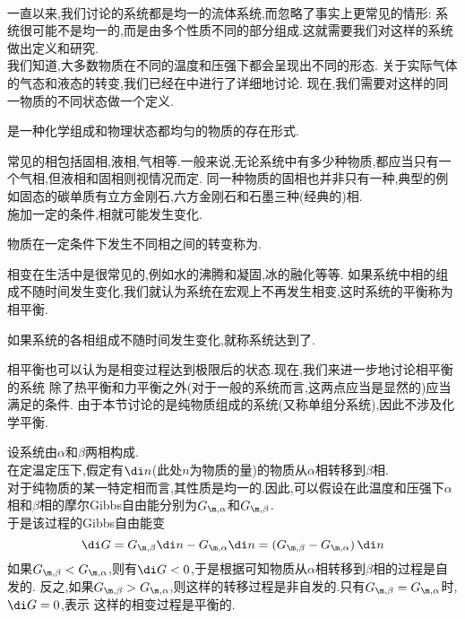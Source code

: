 \documentclass{ctexart}
\begin{document}
\pagestyle{plain}
\noindent{}\vspace{15pt}\\
\indent 一直以来,我们讨论的系统都是均一的流体系统,而忽略了事实上更常见的情形:%
系统很可能不是均一的,而是由多个性质不同的部分组成.这就需要我们对这样的系统做出定义和研究.\vspace{12pt}\\
\indent 我们知道,大多数物质在不同的温度和压强下都会呈现出不同的形态.%
关于实际气体的气态和液态的转变,我们已经在中进行了详细地讨论.%
现在,我们需要对这样的同一物质的不同状态做一个定义.
\begin{definition}[4A.1.1 相]
    是一种化学组成和物理状态都均匀的物质的存在形式.
\end{definition}
常见的相包括固相,液相,气相等.一般来说,无论系统中有多少种物质,都应当只有一个气相,但液相和固相则视情况而定.%
同一种物质的固相也并非只有一种,典型的例如固态的碳单质有立方金刚石,六方金刚石和石墨三种(经典的)相.\vspace{4pt}\\
\indent 施加一定的条件,相就可能发生变化.
\begin{definition}[4A.1.2 相变]
    物质在一定条件下发生不同相之间的转变称为.
\end{definition}
相变在生活中是很常见的,例如水的沸腾和凝固,冰的融化等等.%
如果系统中相的组成不随时间发生变化,我们就认为系统在宏观上不再发生相变,这时系统的平衡称为相平衡.
\begin{definition}[4A.1.3 相平衡]
    如果系统的各相组成不随时间发生变化,就称系统达到了.
\end{definition}
相平衡也可以认为是相变过程达到极限后的状态.现在,我们来进一步地讨论相平衡的系统%
除了热平衡和力平衡之外(对于一般的系统而言,这两点应当是显然的)应当满足的条件.%
由于本节讨论的是纯物质组成的系统(又称单组分系统),因此不涉及化学平衡.
\begin{derivation}
    设系统由$\alpha$和$\beta$两相构成.\\
    在定温定压下,假定有$\di n$(此处$n$为物质的量)的物质从$\alpha$相转移到$\beta$相.\\
    对于纯物质的某一特定相而言,其性质是均一的.因此,可以假设在此温度和压强下$\alpha$相和$\beta$相的摩尔Gibbs自由能分别为$G_{\m,\alpha}$和$G_{\m,\beta}$.\\
    于是该过程的Gibbs自由能变
    \[\di G=G_{\m,\beta}\di n-G_{\m,\alpha}\di n=\left(G_{\m,\beta}-G_{\m,\alpha}\right)\di n\]
    如果$G_{\m,\beta}<G_{\m,\alpha}$,则有$\di G<0$,于是根据可知物质从$\alpha$相转移到$\beta$相的过程是自发的.%
    反之,如果$G_{\m,\beta}>G_{\m,\alpha}$,则这样的转移过程是非自发的.只有$G_{\m,\beta}=G_{\m,\alpha}$时,$\di G=0$,表示%
    这样的相变过程是平衡的.
\end{derivation}
\end{document}
